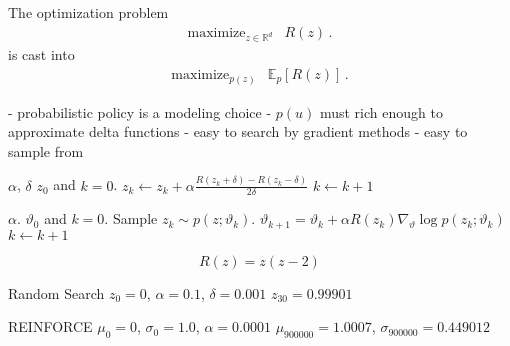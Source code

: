 \documentclass[aspectratio=169,8pt]{beamer}
\newcommand{\R}{\mathbb{R}}
\begin{document}
The optimization problem
\begin{equation}
\begin{array}{ll}
	\mbox{maximize}_{z\in\R^d} & R(z) \,.
\end{array}
\end{equation}
is cast into
\begin{equation}
\begin{array}{ll}
	\mbox{maximize}_{p(z)} & \mathbb{E}_p[R(z)] \,.
\end{array}
\end{equation}

- probabilistic policy is a modeling choice \newline
- $p(u)$ must rich enough to approximate delta functions \newline
- easy to search by gradient methods \newline
- easy to sample from \newline
\eframe

\begin{algorithmic}[1]
 $\alpha$, $\delta$
 $z_0$ and $k = 0$.
\STATE $z_k \leftarrow z_k + \alpha \frac{R(z_k + \delta) - R(z_k - \delta)}{2 \delta}$
\STATE $k\leftarrow k + 1$
\ENDWHILE
\end{algorithmic}
\eframe

\begin{algorithmic}[1]
 $\alpha$.
 $\vartheta_0$ and $k = 0$.
\STATE Sample $z_k\sim p(z;\vartheta_k)$.
\STATE $\vartheta_{k+1} = \vartheta_k + \alpha R(z_k) \nabla_\vartheta \log p(z_k; \vartheta_k)$
\STATE $k\leftarrow k + 1$
\ENDWHILE
\end{algorithmic}
\eframe

\begin{equation}
  R(z) = z (z - 2)
\end{equation}

Random Search \newline
$z_0 = 0$, $\alpha = 0.1$, $\delta = 0.001$ \newline
$z_{30} = 0.99901$ \newline

REINFORCE \newline
$\mu_0 = 0$, $\sigma_0 = 1.0$, $\alpha = 0.0001$ \newline
$\mu_{900000} = 1.0007$,  $\sigma_{900000} = 0.449012$ \newline
\end{document}
